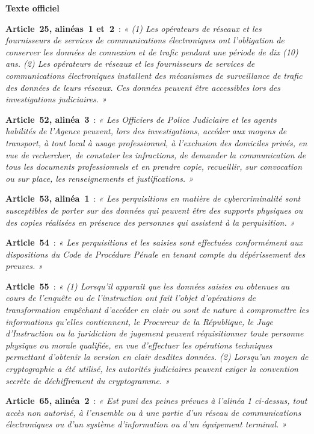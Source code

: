 \begin{boxjuris}
\textbf{Texte officiel}~\cite{cameroun2010a}

\medskip
\textbf{Article~25, alinéas~1 et~2}~: \textit{« (1) Les opérateurs de réseaux et les fournisseurs de services de communications électroniques ont l'obligation de conserver les données de connexion et de trafic pendant une période de dix (10) ans. (2) Les opérateurs de réseaux et les fournisseurs de services de communications électroniques installent des mécanismes de surveillance de trafic des données de leurs réseaux. Ces données peuvent être accessibles lors des investigations judiciaires. »}

\medskip
\textbf{Article~52, alinéa~3}~: \textit{« Les Officiers de Police Judiciaire
et les agents habilités de l'Agence peuvent, lors des investigations,
accéder aux moyens de transport, à tout local à usage professionnel, à
l'exclusion des domiciles privés, en vue de rechercher, de constater les
infractions, de demander la communication de tous les documents
professionnels et en prendre copie, recueillir, sur convocation ou sur
place, les renseignements et justifications. »}

\medskip
\textbf{Article~53, alinéa~1}~: \textit{« Les perquisitions en matière de
cybercriminalité sont susceptibles de porter sur des données qui peuvent
être des supports physiques ou des copies réalisées en présence des
personnes qui assistent à la perquisition. »}

\medskip
\textbf{Article~54}~: \textit{« Les perquisitions et les saisies sont effectuées conformément aux dispositions du Code de Procédure Pénale en tenant compte du dépérissement des preuves. »}

\medskip
\textbf{Article~55}~: \textit{« (1) Lorsqu'il apparaît que les données saisies ou obtenues au cours de l'enquête ou de l'instruction ont fait l'objet d'opérations de transformation empêchant d'accéder en clair ou sont de nature à compromettre les informations qu'elles contiennent, le Procureur de la République, le Juge d'Instruction ou la juridiction de jugement peuvent réquisitionner toute personne physique ou morale qualifiée, en vue d'effectuer les opérations techniques permettant d'obtenir la version en clair desdites données. (2) Lorsqu'un moyen de cryptographie a été utilisé, les autorités judiciaires peuvent exiger la convention secrète de déchiffrement du cryptogramme. »}

\medskip
\textbf{Article~65, alinéa~2}~: \textit{« Est puni des peines prévues à
l'alinéa 1 ci-dessus, tout accès non autorisé, à l'ensemble ou à une
partie d'un réseau de communications électroniques ou d'un système
d'information ou d'un équipement terminal. »}


\end{boxjuris}
